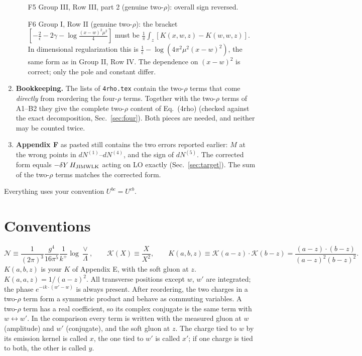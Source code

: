 \documentclass[10pt]{article}
\numberwithin{equation}{section}
\newcommand{\KK}{\mathcal K}
\newcommand{\NN}{\mathcal N}
\begin{document}
\begin{enumerate}
\begin{itemize}
\item[F5] Group III, Row III, part 2 (genuine two-$\rho$): overall sign reversed.
\item[F6] Group I, Row II (genuine two-$\rho$): the bracket $[-\frac2\epsilon-2\gamma-\log\frac{(x-w)^2\mu^2}{4}]$ must be $\frac1\pi\int_z[K(x,w,z)-K(w,w,z)]$. In dimensional regularization this is $\frac1{\bar\epsilon}-\log(4\pi^2\mu^2(x-w)^2)$, the same form as in Group II, Row IV. The dependence on $(x-w)^2$ is correct; only the pole and constant differ.
\end{itemize}
\item \textbf{Bookkeeping.} The lists of \texttt{4rho.tex} contain the two-$\rho$ terms that come \emph{directly} from reordering the four-$\rho$ terms. Together with the two-$\rho$ terms of A1--B2 they give the complete two-$\rho$ content of Eq.~(4rho) (checked against the exact decomposition, Sec.~\ref{sec:four}). Both pieces are needed, and neither may be counted twice.
\item \textbf{Appendix F} as pasted still contains the two errors reported earlier: $M$ at the wrong points in $dN^{(1)}$--$dN^{(4)}$, and the sign of $dN^{(5)}$. The corrected form equals $-\delta Y\,H_{\rm JIMWLK}$ acting on LO exactly (Sec.~\ref{sec:target}). The sum of the two-$\rho$ terms matches the corrected form.
\end{enumerate}
Everything uses your convention $U^{bc}=U^{cb}$.

\section{Conventions}\label{sec:conv}
\begin{equation}
\NN\equiv\frac{1}{(2\pi)^3}\frac{g^4}{16\pi^5}\frac{1}{k^+}\log\frac{\vee}{\Lambda},\qquad \KK(X)\equiv\frac{X}{X^2},\qquad K(a,b,z)\equiv\KK(a-z)\cdot\KK(b-z)=\frac{(a-z)\cdot(b-z)}{(a-z)^2(b-z)^2}.
\end{equation}
$K(a,b,z)$ is your $K$ of Appendix E, with the soft gluon at $z$. $K(a,a,z)=1/(a-z)^2$. All transverse positions except $w$, $w'$ are integrated; the phase $e^{-ik\cdot(w'-w)}$ is always present. After reordering, the two charges in a two-$\rho$ term form a symmetric product and behave as commuting variables. A two-$\rho$ term has a real coefficient, so its complex conjugate is the same term with $w\leftrightarrow w'$. In the comparison every term is written with the measured gluon at $w$ (amplitude) and $w'$ (conjugate), and the soft gluon at $z$. The charge tied to $w$ by its emission kernel is called $x$, the one tied to $w'$ is called $x'$; if one charge is tied to both, the other is called $y$.
\end{document}
